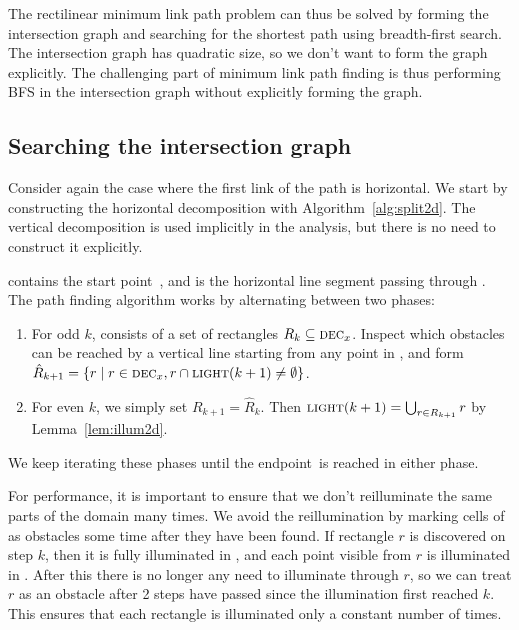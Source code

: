 \documentclass[english,gradu]{tktltiki2018}
\begin{document}
The rectilinear minimum link path problem can thus be solved by forming the intersection graph and searching for the shortest path using breadth-first search.
The intersection graph has quadratic size, so we don't want to form the graph explicitly.
The challenging part of minimum link path finding is thus performing BFS in the intersection graph without explicitly forming the graph.

\subsection{Searching the intersection graph}

Consider again the case where the first link of the path is horizontal.
We start by constructing the horizontal decomposition with Algorithm~\ref{alg:split2d}.
The vertical decomposition is used implicitly in the analysis, but there is no need to construct it explicitly.

 contains the start point~\spt, and  is the horizontal line segment passing through \spt.
The path finding algorithm works by alternating between two phases:

\begin{enumerate}
\item For odd $k$,  consists of a set of rectangles $R_k\subseteq\textsc{dec}_{x}$.
	Inspect which obstacles can be reached by a vertical line starting from any point in , and form $\hat{R}_{k+1}=\left\{r \mid r\in\textsc{dec}_{x}, r\cap\textsc{light}(k+1)\neq\emptyset\right\}$.
\item For even $k$, we simply set $R_{k+1}=\hat{R}_k$.
	Then $\textsc{light}(k+1)=\bigcup_{r\in R_{k+1}}r$ by Lemma~\ref{lem:illum2d}.
\end{enumerate}

We keep iterating these phases until the endpoint~\ept is reached in either phase.

For performance, it is important to ensure that we don't reilluminate the same parts of the domain many times.
We avoid the reillumination by marking cells of  as obstacles some time after they have been found.
If rectangle $r$ is discovered on step $k$, then it is fully illuminated in , and each point visible from $r$ is illuminated in .
After this there is no longer any need to illuminate through $r$, so we can treat $r$ as an obstacle after 2 steps have passed since the illumination first reached $k$.
This ensures that each rectangle is illuminated only a constant number of times.
\end{document}

